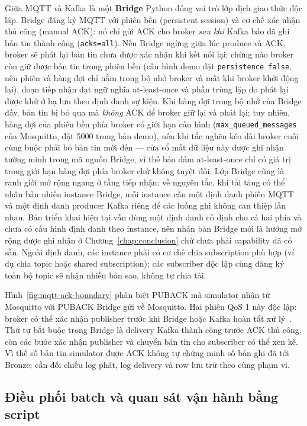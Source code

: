 Giữa MQTT và Kafka là một \textbf{Bridge} Python đóng vai trò lớp dịch giao
thức độc lập. Bridge đăng ký MQTT với phiên bền (persistent session) và cơ
chế xác nhận thủ công (manual ACK): nó chỉ gửi ACK cho broker \emph{sau khi}
Kafka báo đã ghi bản tin thành công (\texttt{acks=all}). Nếu Bridge ngừng
giữa lúc produce và ACK, broker sẽ phát lại bản tin chưa được xác nhận khi
kết nối lại; chừng nào broker còn giữ được bản tin trong phiên bền (cấu hình demo đặt
\texttt{persistence false}, nên phiên và hàng đợi chỉ nằm trong bộ nhớ broker
và mất khi broker khởi động lại), đoạn
tiếp nhận đạt ngữ nghĩa at-least-once và phần trùng lặp do phát lại được
khử ở hạ lưu theo định danh sự kiện. Khi hàng đợi trong bộ nhớ của Bridge
đầy, bản tin bị bỏ qua mà \emph{không} ACK để broker giữ lại và phát lại;
tuy nhiên, hàng đợi của phiên bền phía broker có giới hạn cấu hình
(\texttt{max\_queued\_messages} của Mosquitto, đặt 5000 trong bản demo), nên
khi tắc nghẽn kéo dài broker cuối cùng buộc phải bỏ bản tin mới đến --- cửa
sổ mất dữ liệu này được ghi nhận tường minh trong mã nguồn Bridge, vì thế
bảo đảm at-least-once chỉ có giá trị trong giới hạn hàng đợi phía broker
chứ không tuyệt đối. Lớp Bridge cũng là ranh giới mở rộng ngang ở tầng tiếp
nhận: về nguyên tắc, khi tải tăng có thể nhân bản nhiều instance Bridge,
mỗi instance cần một định danh phiên MQTT và một định danh producer Kafka
riêng để các luồng ghi không can thiệp lẫn nhau. Bản triển khai hiện tại
vẫn dùng một định danh cố định cho cả hai phía và chưa có cấu hình định
danh theo instance, nên nhân bản Bridge mới là hướng mở rộng được ghi nhận
ở Chương~\ref{chap:conclusion} chứ chưa phải capability đã có sẵn. Ngoài
định danh, các instance phải có cơ chế chia subscription phù hợp (ví dụ
chia topic hoặc shared subscription); các subscriber độc lập cùng đăng
ký toàn bộ topic sẽ nhận nhiều bản sao, không tự chia tải.



Hình~\ref{fig:mqtt-ack-boundary} phân biệt PUBACK mà simulator nhận từ
Mosquitto với PUBACK Bridge gửi về Mosquitto. Hai phiên QoS 1 này độc lập:
broker có thể xác nhận publisher trước khi Bridge hoặc Kafka hoàn tất
xử lý~\cite{mqtt_v311_spec}. Thứ tự bắt buộc trong Bridge là delivery
Kafka thành công trước ACK thủ công, còn các bước xác nhận publisher và
chuyển bản tin cho subscriber có thể xen kẽ. Vì thế số bản tin simulator
được ACK không tự chứng minh số bản ghi đã tới Bronze; cần đối chiếu log
phát, log delivery và row lưu trữ theo cùng phạm vi.

\subsection{Điều phối batch và quan sát vận hành bằng script}

